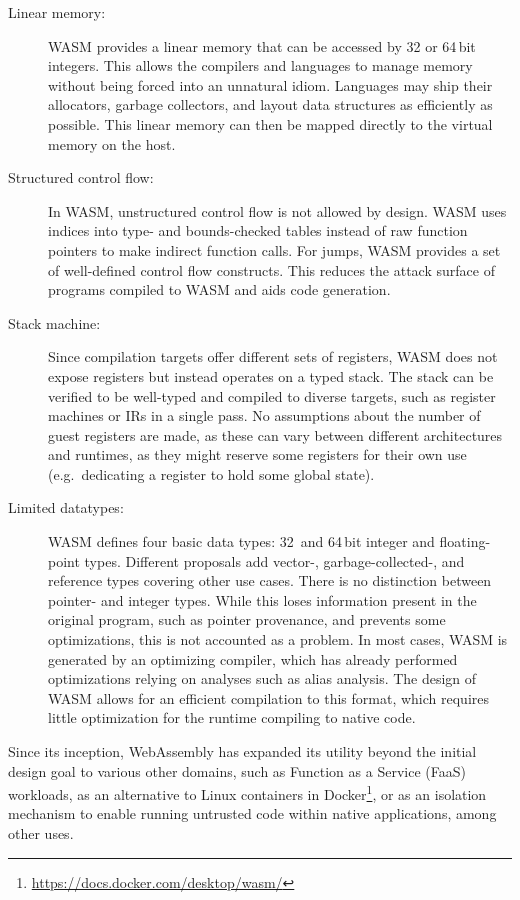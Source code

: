\begin{description}
    \item[Linear memory:] \Ac{WASM} provides a linear memory that can be accessed by 32 or 64\,bit integers.
    This allows the compilers and languages to manage memory without being forced into an unnatural idiom.
    Languages may ship their allocators, garbage collectors, and layout data structures as efficiently as possible.
    This linear memory can then be mapped directly to the virtual memory on the host.
    \item[Structured control flow:] In \ac{WASM}, unstructured control flow is not allowed by design.
    \ac{WASM} uses indices into type- and bounds-checked tables instead of raw function pointers to make indirect function calls.
    For jumps, \ac{WASM} provides a set of well-defined control flow constructs.
    This reduces the attack surface of programs compiled to \ac{WASM} and aids code generation.
    \item[Stack machine:] Since compilation targets offer different sets of registers, \ac{WASM} does not expose registers but instead operates on a typed stack.
    The stack can be verified to be well-typed and compiled to diverse targets, such as register machines or \acp{IR} in a single pass.
    No assumptions about the number of guest registers are made, as these can vary between different architectures and runtimes, as they might reserve some registers for their own use (e.g.\ dedicating a register to hold some global state).
    \item[Limited datatypes:] \Ac{WASM} defines four basic data types: 32\, and 64\,bit integer and floating-point types.
    Different proposals add \mbox{vector-}, \mbox{garbage-collected-}, and reference types covering other use cases.
    There is no distinction between pointer- and integer types.
    While this loses information present in the original program, such as pointer provenance, and prevents some optimizations, this is not accounted as a problem.
    In most cases, \ac{WASM} is generated by an optimizing compiler, which has already performed optimizations relying on analyses such as alias analysis.
    The design of \ac{WASM} allows for an efficient compilation to this format, which requires little optimization for the runtime compiling to native code.
\end{description}

Since its inception, WebAssembly has expanded its utility beyond the initial design goal to various other domains, such as Function as a Service (FaaS) workloads, as an alternative to Linux containers in Docker\footnote{\url{https://docs.docker.com/desktop/wasm/}}, or as an isolation mechanism to enable running untrusted code within native applications, among other uses.

